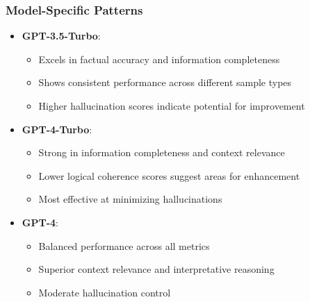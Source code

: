 \subsubsection{Model-Specific Patterns}
\begin{itemize}
    \item \textbf{GPT-3.5-Turbo}:
    \begin{itemize}
        \item Excels in factual accuracy and information completeness
        \item Shows consistent performance across different sample types
        \item Higher hallucination scores indicate potential for improvement
    \end{itemize}
    
    \item \textbf{GPT-4-Turbo}:
    \begin{itemize}
        \item Strong in information completeness and context relevance
        \item Lower logical coherence scores suggest areas for enhancement
        \item Most effective at minimizing hallucinations
    \end{itemize}
    
    \item \textbf{GPT-4}:
    \begin{itemize}
        \item Balanced performance across all metrics
        \item Superior context relevance and interpretative reasoning
        \item Moderate hallucination control
    \end{itemize}
\end{itemize}

